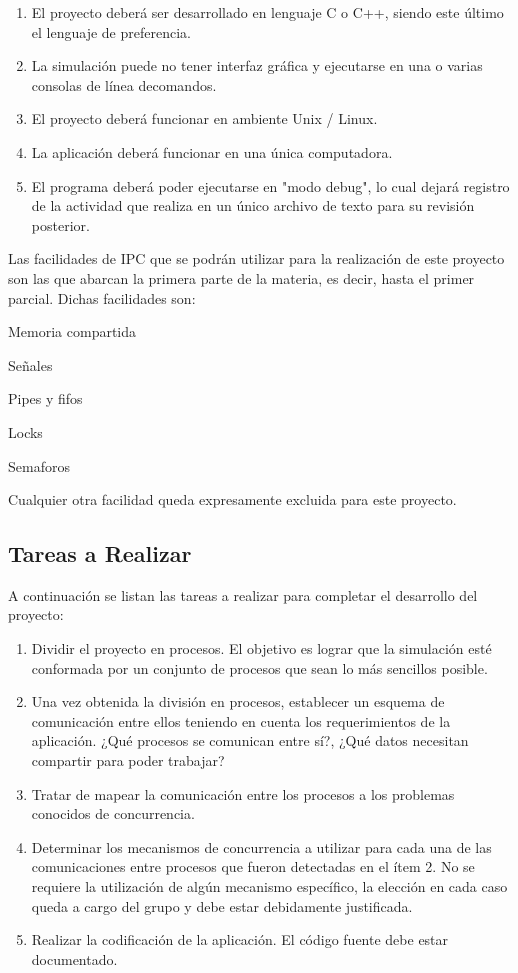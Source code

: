 \documentclass[12pt,a4paper,titlepage,oneside]{article}
\renewenvironment{itemize}{
 \begin{list}{}{
  \setlength{\leftmargin}{1.5em}
 }
}{
 \end{list}
}
\begin{document}
\begin{enumerate}
 \item
  El proyecto deberá ser desarrollado en lenguaje C o C++, siendo este último el  lenguaje de preferencia.
  \item
  La simulación puede no tener interfaz gráfica y ejecutarse en una o varias consolas de línea decomandos.
  \item
  El proyecto deberá funcionar en ambiente Unix / Linux.
  \item
La aplicación deberá funcionar en una única computadora.  
\item
El programa deberá poder ejecutarse en "modo debug", lo cual dejará registro de la actividad que realiza en un único archivo de texto para su revisión posterior.
\end{enumerate} 


Las facilidades de IPC que se podrán utilizar para la realización de este proyecto son las que abarcan la primera parte de la materia, es decir, hasta el primer parcial. Dichas facilidades son: 
\begin{itemize}
\item[•] Memoria compartida
\item[•] Señales
\item[•] Pipes y fifos
\item[•] Locks
\item[•] Semaforos
\end{itemize}

Cualquier otra facilidad queda expresamente excluida para este proyecto.

\subsection{Tareas a Realizar}

A continuación se listan las tareas a realizar para completar el desarrollo del proyecto:

\begin{enumerate}
\item
 Dividir el proyecto en procesos. El objetivo es lograr que la simulación esté conformada por un conjunto de procesos que sean lo más sencillos posible.
\item
Una vez obtenida la división en procesos, establecer un esquema de comunicación entre ellos teniendo en cuenta los requerimientos de la aplicación. ¿Qué procesos se comunican entre sí?, ¿Qué datos necesitan compartir para poder trabajar?
\item
Tratar de mapear la comunicación entre los procesos a los problemas conocidos de concurrencia.
\item 
Determinar los mecanismos de concurrencia a utilizar para cada una de las comunicaciones entre procesos que fueron detectadas en el ítem 2. No se requiere la utilización de algún mecanismo específico, la elección en cada caso queda a cargo del grupo y debe estar debidamente justificada.
\item
 Realizar la codificación de la aplicación. El código fuente debe estar documentado.
\end{enumerate}
 
\end{document}
